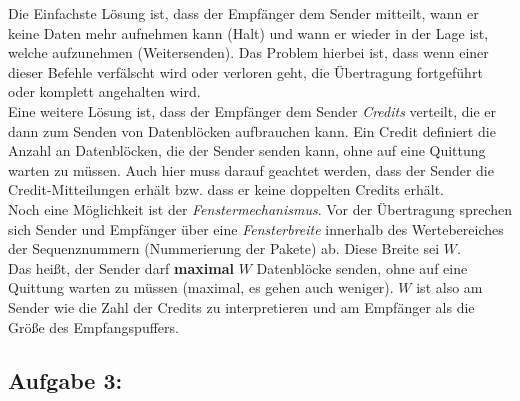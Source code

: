 \documentclass[11pt, a4paper]{article}
\begin{document}
Die Einfachste Lösung ist, dass der Empfänger dem Sender mitteilt, wann er keine Daten mehr aufnehmen kann (Halt) und wann er wieder in der Lage ist, welche aufzunehmen (Weitersenden). Das Problem hierbei ist, dass wenn einer dieser Befehle verfälscht wird oder verloren geht, die Übertragung fortgeführt oder komplett angehalten wird.\\

Eine weitere Lösung ist, dass der Empfänger dem Sender \emph{Credits} verteilt, die er dann zum Senden von Datenblöcken aufbrauchen kann. Ein Credit definiert die Anzahl an Datenblöcken, die der Sender senden kann, ohne auf eine Quittung warten zu müssen. Auch hier muss darauf geachtet werden, dass der Sender die Credit-Mitteilungen erhält bzw. dass er keine doppelten Credits erhält.\\

Noch eine Möglichkeit ist der \emph{Fenstermechanismus}. Vor der Übertragung sprechen sich Sender und Empfänger über eine \emph{Fensterbreite} innerhalb des Wertebereiches der Sequenznummern (Nummerierung der Pakete) ab. Diese Breite sei $W$.\\

Das heißt, der Sender darf \textbf{maximal} $W$ Datenblöcke senden, ohne auf eine Quittung warten zu müssen (maximal, es gehen auch weniger). $W$ ist also am Sender wie die Zahl der Credits zu interpretieren und am Empfänger als die Größe des Empfangspuffers.\\




\subsection{Aufgabe 3:}


\end{document}
